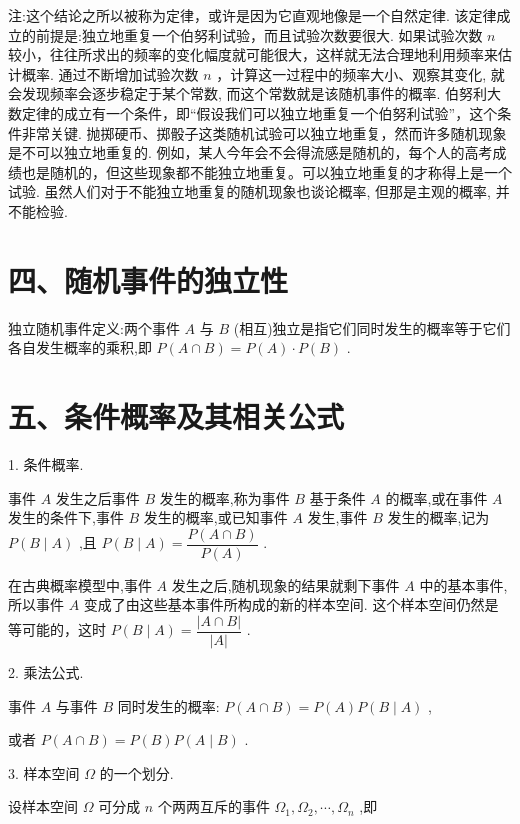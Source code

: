 注:这个结论之所以被称为定律，或许是因为它直观地像是一个自然定律. 该定律成立的前提是:独立地重复一个伯努利试验，而且试验次数要很大. 如果试验次数 $n$ 较小，往往所求出的频率的变化幅度就可能很大，这样就无法合理地利用频率来估计概率. 通过不断增加试验次数 $n$ ，计算这一过程中的频率大小、观察其变化, 就会发现频率会逐步稳定于某个常数, 而这个常数就是该随机事件的概率. 伯努利大数定律的成立有一个条件，即“假设我们可以独立地重复一个伯努利试验”，这个条件非常关键. 抛掷硬币、掷骰子这类随机试验可以独立地重复，然而许多随机现象是不可以独立地重复的. 例如，某人今年会不会得流感是随机的，每个人的高考成绩也是随机的，但这些现象都不能独立地重复。可以独立地重复的才称得上是一个试验. 虽然人们对于不能独立地重复的随机现象也谈论概率, 但那是主观的概率, 并不能检验.

\section*{四、随机事件的独立性}

独立随机事件定义:两个事件 $A$ 与 $B$ (相互)独立是指它们同时发生的概率等于它们各自发生概率的乘积,即 $P\left( {A \cap  B}\right)  = P\left( A\right)  \cdot  P\left( B\right)$ .

\section*{五、条件概率及其相关公式}

1. 条件概率.

事件 $A$ 发生之后事件 $B$ 发生的概率,称为事件 $B$ 基于条件 $A$ 的概率,或在事件 $A$ 发生的条件下,事件 $B$ 发生的概率,或已知事件 $A$ 发生,事件 $B$ 发生的概率,记为 $P\left( {B \mid  A}\right)$ ,且 $P\left( {B \mid  A}\right)  = \dfrac{P\left( {A \cap  B}\right) }{P\left( A\right) }$ .

在古典概率模型中,事件 $A$ 发生之后,随机现象的结果就剩下事件 $A$ 中的基本事件,所以事件 $A$ 变成了由这些基本事件所构成的新的样本空间. 这个样本空间仍然是等可能的，这时 $P\left( {B \mid  A}\right)  = \dfrac{\left| A \cap  B\right| }{\left| A\right| }$ .

2. 乘法公式.

事件 $A$ 与事件 $B$ 同时发生的概率: $P\left( {A \cap  B}\right)  = P\left( A\right) P\left( {B \mid  A}\right)$ ,

或者 $P\left( {A \cap  B}\right)  = P\left( B\right) P\left( {A \mid  B}\right)$ .

3. 样本空间 $\Omega$ 的一个划分.

设样本空间 $\Omega$ 可分成 $n$ 个两两互斥的事件 ${\Omega }_{1},{\Omega }_{2},\cdots ,{\Omega }_{n}$ ,即

